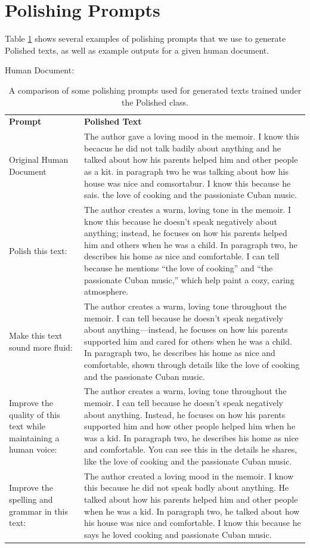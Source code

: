 \documentclass[11pt]{article}
\begin{document}
\section{Polishing Prompts}
\label{appendix:polishing_prompts}
Table \ref{table:polish_prompts} shows several examples of polishing prompts that we use to generate Polished texts, as well as example outputs for a given human document.

Human Document: 

\begin{table}[t]
\centering
\small
\begin{tabular}{p{} p{}}
\toprule
\textbf{Prompt} & \textbf{Polished Text} \\
Original Human Document & The author gave a loving mood in the memoir. I know this becacus he did not talk badily about anything and he talked about how his parents helped him and other people as a kit. in paragraph two he was talking about how his house was nice and comsortabur. I know this because he sais. the love of cooking and the passioniate Cuban music. \\
Polish this text: & The author creates a warm, loving tone in the memoir. I know this because he doesn’t speak negatively about anything; instead, he focuses on how his parents helped him and others when he was a child. In paragraph two, he describes his home as nice and comfortable. I can tell because he mentions “the love of cooking” and “the passionate Cuban music,” which help paint a cozy, caring atmosphere.  \\
\midrule
Make this text sound more fluid: & The author creates a warm, loving tone throughout the memoir. I can tell because he doesn’t speak negatively about anything—instead, he focuses on how his parents supported him and cared for others when he was a child. In paragraph two, he describes his home as nice and comfortable, shown through details like the love of cooking and the passionate Cuban music. \\
\midrule
Improve the quality of this text while maintaining a human voice: & The author creates a warm, loving tone throughout the memoir. I can tell because he doesn’t speak negatively about anything. Instead, he focuses on how his parents supported him and how other people helped him when he was a kid. In paragraph two, he describes his home as nice and comfortable. You can see this in the details he shares, like the love of cooking and the passionate Cuban music. \\
\midrule
Improve the spelling and grammar in this text: & The author created a loving mood in the memoir. I know this because he did not speak badly about anything. He talked about how his parents helped him and other people when he was a kid. In paragraph two, he talked about how his house was nice and comfortable. I know this because he says he loved cooking and passionate Cuban music.\\
\bottomrule
\end{tabular}
\caption{A comparison of some polishing prompts used for generated texts trained under the Polished class.}
\label{table:polish_prompts}
\end{table}
\end{document}
